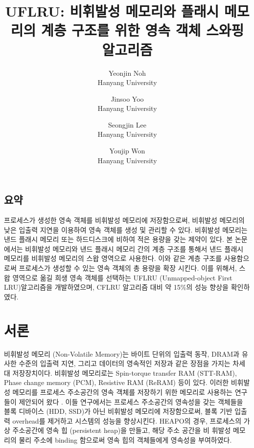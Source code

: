 \documentclass[letterpaper,twocolumn,10pt]{article}
\begin{document}
\date{}

\title{\Large \bf UFLRU: 비휘발성 메모리와 플래시 메모리의 계층 구조를 위한 영속 객체 스와핑 알고리즘}

\author{
{\rm Yeonjin Noh}\\
Hanyang University
\and
{\rm Jinsoo Yoo}\\
Hanyang University
\and
{\rm Seongjin Lee}\\
Hanyang University
\and
{\rm Youjip Won}\\
Hanyang University
} %

\maketitle

\thispagestyle{empty}


\subsection*{요약} 
프로세스가 생성한 영속 객체를 비휘발성 메모리에 저장함으로써, 비휘발성 메모리의 낮은 입출력 지연을 이용하여 영속 객체를 생성 및 관리할 수 있다. 비휘발성 메모리는 낸드 플래시 메모리 또는 하드디스크에 비하여 적은 용량을 갖는 제약이 있다. 본 논문에서는 비휘발성 메모리와 낸드 플래시 메모리 간의 계층 구조를 통해서 낸드 플래시 메모리를 비휘발성 메모리의 스왑 영역으로 사용한다. 이와 같은 계층 구조를 사용함으로써 프로세스가 생성할 수 있는 영속 객체의 총 용량을 확장 시킨다. 이를 위해서, 스왑 영역으로 옮길 희생 영속 객체를 선택하는 UFLRU (Unmapped-object First LRU)알고리즘을 개발하였으며, CFLRU 알고리즘 대비 약 15\%의 성능 향상을 확인하였다.

\section{서론}
비휘발성 메모리 (Non-Volatile Memory)는 바이트 단위의 입출력 동작, DRAM과 유사한 수준의 입출력 지연, 그리고 데이터의 영속적인 저장과 같은 장점을 가지는 차세대 저장장치이다. 비휘발성 메모리로는 Spin-torque transfer RAM (STT-RAM), Phase change memory (PCM), Resistive RAM (ReRAM) 등이 있다. 이러한 비휘발성 메모리를 프로세스 주소공간의 영속 객체\cite{}를 저장하기 위한 메모리로 사용하는 연구들이 제안되어 왔다 \cite{Memosyne}\cite{hwang2015heapo}\cite{others}. 이들 연구에서는 프로세스 주소공간의 영속성을 갖는 객체들을 블록 디바이스 (HDD, SSD)가 아닌 비휘발성 메모리에 저장함으로써, 블록 기반 입출력 overhead를 제거하고 시스템의 성능을 향상시킨다. HEAPO\cite{HEAPO}의 경우, 프로세스의 가상 주소공간에 영속 힙 (persistent heap)을 만들고, 해당 주소 공간을 비 휘발성 메모리의 물리 주소에 binding 함으로써 영속 힙의 객체들에게 영속성을 부여하였다.
\end{document}
